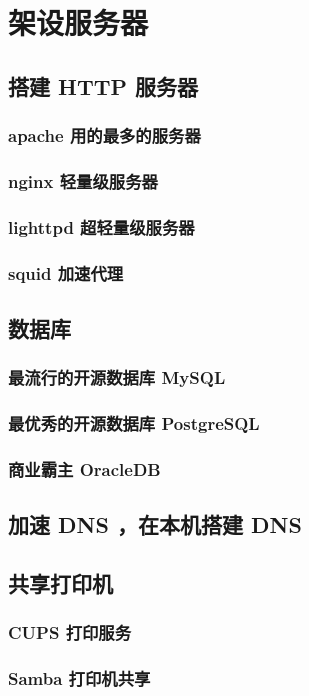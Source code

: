 \documentclass[amstex,twoside]{ctexbook}
\begin{document}
\chapter{架设服务器}
\section{  搭建 HTTP 服务器}
\subsection{  apache 用的最多的服务器}
\subsection{ nginx 轻量级服务器}
\subsection{ lighttpd 超轻量级服务器}
\subsection{ squid 加速代理	}
\section{  数据库	}
\subsection{  最流行的开源数据库 MySQL}
\subsection{  最优秀的开源数据库 PostgreSQL 	}
\subsection{  商业霸主 OracleDB	}
\section{  加速 DNS ，在本机搭建 DNS	}
\section{  共享打印机	}
\subsection{ CUPS 打印服务	}
\subsection{ Samba 打印机共享	}
\end{document}
